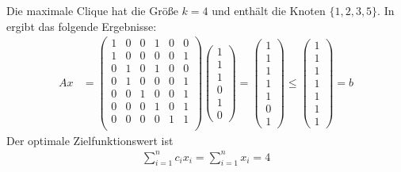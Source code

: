 \begin{enumerate}
\begin{enumerate}[(a)]
        Die maximale Clique hat die Größe $k = 4$ und enthält die Knoten
        $\{1,2,3,5\}$. In \NELP{} ergibt das folgende Ergebnisse:
        \begin{align*}
          Ax & = \begin{pmatrix}
            1 & 0 & 0 & 1 & 0 & 0\\
            1 & 0 & 0 & 0 & 0 & 1\\
            0 & 1 & 0 & 1 & 0 & 0\\
            0 & 1 & 0 & 0 & 0 & 1\\
            0 & 0 & 1 & 0 & 0 & 1\\
            0 & 0 & 0 & 1 & 0 & 1\\
            0 & 0 & 0 & 0 & 1 & 1\\
          \end{pmatrix}
          \begin{pmatrix}
            1\\
            1\\
            1\\
            0\\
            1\\
            0
          \end{pmatrix}
          =
          \begin{pmatrix}
            1\\
            1\\
            1\\
            1\\
            1\\
            0\\
            1
          \end{pmatrix}
          \leq
          \begin{pmatrix}
            1\\
            1\\
            1\\
            1\\
            1\\
            1\\
            1
          \end{pmatrix}
          = b
        \end{align*}
        Der optimale Zielfunktionswert ist
        \begin{align*}
          \sum\limits_{i=1}^n c_i x_i = \sum\limits_{i=1}^n x_i = 4
        \end{align*}
    \end{enumerate}
\end{enumerate}
